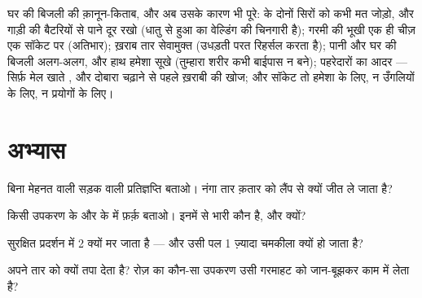 \begin{remark}[नियम, अंतिम रूप में]\label{rem:g7:short-circuits-safety:rules}
घर की बिजली की क़ानून-किताब, और अब उसके कारण भी पूरे:  के दोनों
सिरों को कभी मत जोड़ो, और गाड़ी की बैटरियों से पाने दूर रखो (धातु से
हुआ  का  वेल्डिंग की चिनगारी है); गरमी की भूखी एक ही चीज़
एक सॉकेट पर (अतिभार); ख़राब तार सेवामुक्त (उधड़ती परत रिहर्सल करता
 है); पानी और घर की बिजली अलग-अलग, और हाथ हमेशा सूखे (तुम्हारा
शरीर कभी बाईपास न बने); पहरेदारों का आदर --- सिर्फ़ मेल खाते ,
और दोबारा चढ़ाने से पहले ख़राबी की खोज; और सॉकेट तो हमेशा के लिए, न
उँगलियों के लिए, न प्रयोगों के लिए।
\end{remark}

\section{अभ्यास}

\begin{exercise}[$\star$]\label{exo:g7:short-circuits-safety:1}
बिना मेहनत वाली सड़क वाली प्रतिज्ञप्ति बताओ। नंगा तार क़तार को लैंप से
क्यों जीत ले जाता है?
\end{exercise}

\begin{exercise}[$\star$]\label{exo:g7:short-circuits-safety:2}
किसी उपकरण के  और  के  में फ़र्क़ बताओ। इनमें से भारी
कौन है, और क्यों?
\end{exercise}

\begin{exercise}[$\star$]\label{exo:g7:short-circuits-safety:3}
सुरक्षित प्रदर्शन में  2 क्यों मर जाता है --- और उसी पल  1
ज़्यादा चमकीला क्यों हो जाता है?
\end{exercise}

\begin{exercise}[$\star$]\label{exo:g7:short-circuits-safety:4}
 अपने तार को क्यों तपा देता है? रोज़ का कौन-सा उपकरण उसी
गरमाहट को जान-बूझकर काम में लेता है?
\end{exercise}

